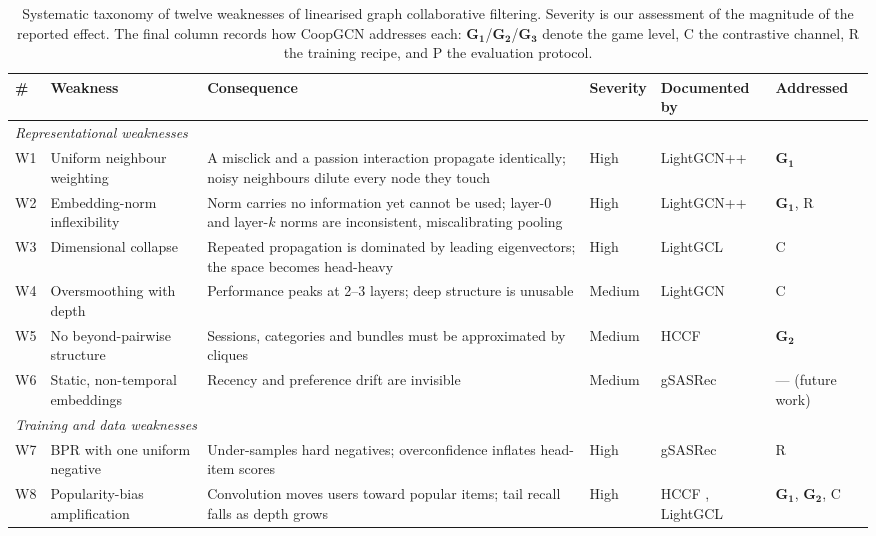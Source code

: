 \documentclass[final,5p,times,twocolumn]{elsarticle}
\begin{document}
\begin{table}[t]
\centering
\caption{Systematic taxonomy of twelve weaknesses of linearised graph
collaborative filtering. Severity is our assessment of the magnitude of the
reported effect. The final column records how CoopGCN addresses each:
$\mathbf{G_1}$/$\mathbf{G_2}$/$\mathbf{G_3}$ denote the game level, C the
contrastive channel, R the training recipe, and P the evaluation protocol.}
\label{tab:weaknesses}
\small
\begin{tabular}{llp{6.5cm}lp{3.0cm}l}
\toprule
\textbf{\#} & \textbf{Weakness} & \textbf{Consequence} & \textbf{Severity} &
\textbf{Documented by} & \textbf{Addressed} \\
\midrule
\multicolumn{6}{l}{\textit{Representational weaknesses}} \\
\midrule
W1 & Uniform neighbour weighting & A misclick and a passion interaction
propagate identically; noisy neighbours dilute every node they touch & High &
LightGCN++ \citep{lee2024lightgcnpp} & $\mathbf{G_1}$ \\
W2 & Embedding-norm inflexibility & Norm carries no information yet cannot be
used; layer-0 and layer-$k$ norms are inconsistent, miscalibrating pooling &
High & LightGCN++ \citep{lee2024lightgcnpp} & $\mathbf{G_1}$, R \\
W3 & Dimensional collapse & Repeated propagation is dominated by leading
eigenvectors; the space becomes head-heavy & High & LightGCL
\citep{cai2023lightgcl} & C \\
W4 & Oversmoothing with depth & Performance peaks at 2--3 layers; deep
structure is unusable & Medium & LightGCN \citep{he2020lightgcn} & C \\
W5 & No beyond-pairwise structure & Sessions, categories and bundles must be
approximated by cliques & Medium & HCCF \citep{xia2022hccf} & $\mathbf{G_2}$ \\
W6 & Static, non-temporal embeddings & Recency and preference drift are
invisible & Medium & gSASRec \citep{petrov2023gsasrec} & --- (future work) \\
\midrule
\multicolumn{6}{l}{\textit{Training and data weaknesses}} \\
\midrule
W7 & BPR with one uniform negative & Under-samples hard negatives;
overconfidence inflates head-item scores & High & gSASRec
\citep{petrov2023gsasrec} & R \\
W8 & Popularity-bias amplification & Convolution moves users toward popular
items; tail recall falls as depth grows & High & HCCF \citep{xia2022hccf},
LightGCL \citep{cai2023lightgcl} & $\mathbf{G_1}$, $\mathbf{G_2}$, C \\

\end{tabular}
\end{table}
\end{document}
